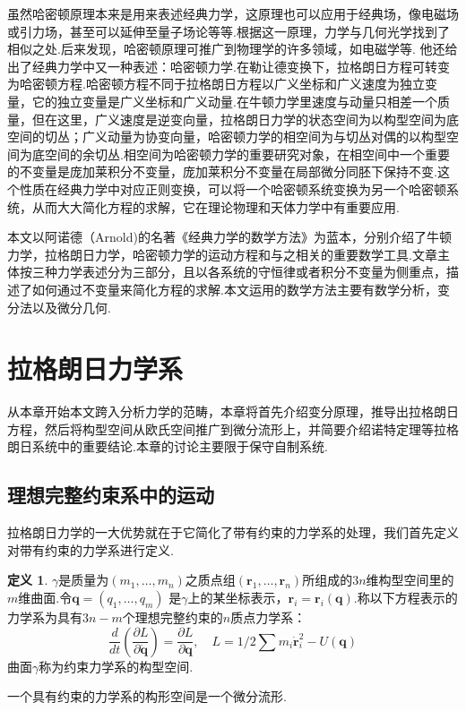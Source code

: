 \documentclass[UTF8,10.5pt,a4paper]{ctexart}
\numberwithin{equation}{section}
\theoremstyle{definition}
\theoremstyle{definition}
\newtheorem{dfn}{定义\hspace{0.05pt}}[section]
\begin{document}
虽然哈密顿原理本来是用来表述经典力学，这原理也可以应用于经典场，像电磁场或引力场，甚至可以延伸至量子场论等等.根据这一原理，力学与几何光学找到了相似之处.后来发现，哈密顿原理可推广到物理学的许多领域，如电磁学等. 他还给出了经典力学中又一种表述：哈密顿力学.在勒让德变换下，拉格朗日方程可转变为哈密顿方程.哈密顿方程不同于拉格朗日方程以广义坐标和广义速度为独立变量，它的独立变量是广义坐标和广义动量.在牛顿力学里速度与动量只相差一个质量，但在这里，广义速度是逆变向量，拉格朗日力学的状态空间为以构型空间为底空间的切丛；广义动量为协变向量，哈密顿力学的相空间为与切丛对偶的以构型空间为底空间的余切丛.相空间为哈密顿力学的重要研究对象，在相空间中一个重要的不变量是庞加莱积分不变量，庞加莱积分不变量在局部微分同胚下保持不变.这个性质在经典力学中对应正则变换，可以将一个哈密顿系统变换为另一个哈密顿系统，从而大大简化方程的求解，它在理论物理和天体力学中有重要应用.
\par 本文以阿诺德（Arnold)的名著《经典力学的数学方法》为蓝本，分别介绍了牛顿力学，拉格朗日力学，哈密顿力学的运动方程和与之相关的重要数学工具.文章主体按三种力学表述分为三部分，且以各系统的守恒律或者积分不变量为侧重点，描述了如何通过不变量来简化方程的求解.本文运用的数学方法主要有数学分析，变分法以及微分几何.
\newpage

\section{拉格朗日力学系}
\par 从本章开始本文跨入分析力学的范畴，本章将首先介绍变分原理，推导出拉格朗日方程，然后将构型空间从欧氏空间推广到微分流形上，并简要介绍诺特定理等拉格朗日系统中的重要结论.本章的讨论主要限于保守自制系统.

\subsection{理想完整约束系中的运动}
拉格朗日力学的一大优势就在于它简化了带有约束的力学系的处理，我们首先定义对带有约束的力学系进行定义.
\begin{dfn}
$\gamma$是质量为$(m_1,\ldots,m_n)$之质点组$(\textbf{r}_1,\ldots,\textbf{r}_n)$所组成的$3n$维构型空间里的$m$维曲面.令$\textbf{q}=(q_1,\ldots,q_m)$ 是$\gamma$上的某坐标表示，$\textbf{r}_i=\textbf{r}_i(\textbf{q})$.称以下方程表示的力学系为具有$3n-m$个理想完整约束的$n$质点力学系：
$$\frac{d}{dt}(\frac{\partial L}{\partial\dot{\textbf{q}}})=\frac{\partial L}{\partial\textbf{q}},\quad L=1/2\sum m_i\dot{\textbf{r}}_i^2-U(\textbf{q})$$
曲面$\gamma$称为约束力学系的构型空间.
\end{dfn}
一个具有约束的力学系的构形空间是一个微分流形.
\end{document}
